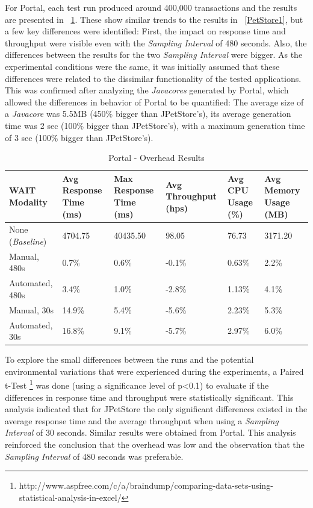 \documentclass[runningheads,a4paper]{llncs}
\begin{document}
For Portal, each test run produced around 400,000 transactions and the
results are presented in \tablename ~\ref{Portal1}. These show similar trends
to the results in \tablename ~\ref{PetStore1}, but a few
key differences were identified: First, the impact on response time and
throughput were visible even with the \emph{Sampling Interval} of 480 seconds.
Also, the differences between the results for the two \emph{Sampling Interval}
were bigger. As the experimental conditions were the same, it was initially
assumed that these differences were related to the dissimilar functionality of the 
tested applications. This was confirmed after analyzing the \emph{Javacores} generated 
by Portal, which allowed the differences in behavior of Portal to be quantified:
The average size of a \emph{Javacore} was 5.5MB (450\% bigger than JPetStore's), its 
average generation time was 2 sec (100\% bigger than JPetStore's), with a maximum 
generation time of 3 sec (100\% bigger than JPetStore's).

\vspace{-2pt}
\begin{table}[!h]
\caption{Portal - Overhead Results}
\label{Portal1}
\centering
\begin{tabular}{p{}|p{}|p{}|p{}|p{}|p{}}
\hline
\bfseries WAIT Modality & \bfseries Avg Response Time (ms)& \bfseries Max
Response Time (ms)& \bfseries Avg Throughput (hps)& \bfseries Avg CPU Usage
(\%) & \bfseries Avg Memory Usage (MB)\\
\hline
None (\emph{Baseline}) 	& 4704.75	& 40435.50	& 98.05 	& 76.73 	& 3171.20\\
Manual, 480s 			& 0.7\% 	& 0.6\%		& -0.1\%	& 0.63\% 	& 2.2\%\\
Automated, 480s 		& 3.4\%		& 1.0\%		& -2.8\% 	& 1.13\% 	& 4.1\%\\
Manual, 30s 			& 14.9\%	& 5.4\%		& -5.6\% 	& 2.23\% 	& 5.3\%\\
Automated, 30s 			& 16.8\%	& 9.1\%		& -5.7\% 	& 2.97\% 	& 6.0\%\\
\hline
\end{tabular}
\end{table}
\vspace{-2pt}


To explore the small differences between the runs and the potential
environmental variations that were experienced during the experiments, a Paired
t-Test
\footnote{http://www.aspfree.com/c/a/braindump/comparing-data-sets-using-statistical-analysis-in-excel/}
was done (using a significance level of p\textless0.1) to evaluate if the
differences in response time and throughput were statistically significant. 
This analysis indicated that for JPetStore the only significant differences existed in the average response
time and the average throughput when using a
\emph{Sampling Interval} of 30 seconds. Similar results were obtained from Portal. This analysis reinforced the
conclusion that the overhead was low and the observation that the
\emph{Sampling Interval} of 480 seconds was preferable.
\end{document}
